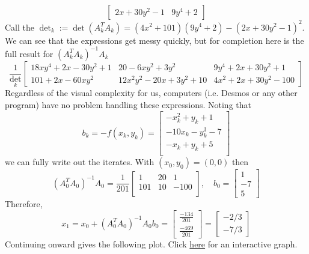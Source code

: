 \documentclass[11pt]{article}
\begin{document}
\begin{example}{}{}
$$\begin{bmatrix}
        2x+30y^2-1 & 9y^4+2
    \end{bmatrix}$$
    Call the $\det_k := \det(A_k^TA_k) =  (4x^2+101)(9y^4+2)-(2x+30y^2-1)^2$.
    We can see that the expressions get messy quickly, but for completion here is the full result for $(A_k^T A_k)^{-1}A_k$ $$ \frac{1}{\det_k}
\begin{bmatrix}
18xy^4+2x-30y^2+1 &
20-6xy^2+3y^2 &
9y^4+2x+30y^2+1
\\[6pt]
101+2x-60xy^2 &
12x^2y^2-20x+3y^2+10 &
4x^2+2x+30y^2-100
\end{bmatrix}$$
Regardless of the visual complexity for us, computers (i.e. Desmos or any other program) have no problem handling these expressions.
Noting that $$b_k = -f(x_k,y_k) = \begin{bmatrix}
    -x_k^2+y_k+1\\
    -10x_k-y_k^3-7\\
    -x_k+y_k+5\\
\end{bmatrix}$$
we can fully write out the iterates. With $(x_0, y_0) = (0,0)$ then $$(A_0^T A_0)^{-1}A_0 = \frac{1}{201}\begin{bmatrix}
    1 & 20  & 1\\
    101 & 10 & -100\\
\end{bmatrix}, \quad b_0 = \begin{bmatrix}
    1 \\ -7 \\ 5
\end{bmatrix}$$
Therefore, $$x_1 = x_0 + (A_0^T A_0)^{-1}A_0 b_0 = \begin{bmatrix}
    \frac{-134}{201}\\ 
    \frac{-469}{201}
\end{bmatrix}=\begin{bmatrix}
    -2/3\\-7/3
\end{bmatrix}$$
Continuing onward gives the following plot. Click \href{https://www.desmos.com/calculator/srdsnfelex}{here} for an interactive graph.

\end{example}
\end{document}
